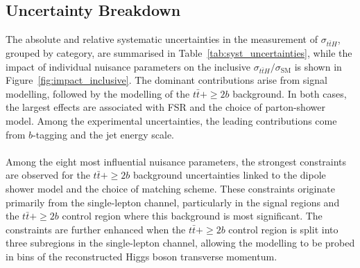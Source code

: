 \subsection{Uncertainty Breakdown}
The absolute and relative systematic uncertainties in the measurement of $\sigma_{t\bar{t}H}$, grouped by category, are summarised in Table~\ref{tab:syst_uncertainties}, while the impact of individual nuisance parameters on the inclusive $\sigma_{t\bar{t}H}/\sigma_\text{SM}$ is shown in Figure~\ref{fig:impact_inclusive}. The dominant contributions arise from signal modelling, followed by the modelling of the $t\bar{t}+\geq 2b$ background. In both cases, the largest effects are associated with FSR and the choice of parton-shower model. Among the experimental uncertainties, the leading contributions come from $b$-tagging and the jet energy scale.\\
\\
Among the eight most influential nuisance parameters, the strongest constraints are observed for the $t\bar{t}+\geq 2b$ background uncertainties linked to the dipole shower model and the choice of matching scheme. These constraints originate primarily from the single-lepton channel, particularly in the signal regions and the $t\bar{t}+\geq 2b$ control region where this background is most significant. The constraints are further enhanced when the $t\bar{t}+\geq 2b$ control region is split into three subregions in the single-lepton channel, allowing the modelling to be probed in bins of the reconstructed Higgs boson transverse momentum.  
